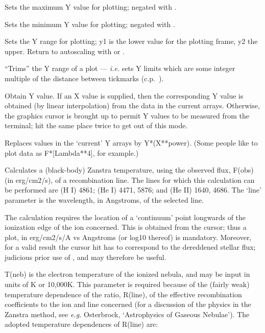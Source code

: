 \begin {description}
Sets the maximum Y value for plotting; negated with . 

Sets the minimum Y value for plotting; negated with . 

Sets the Y range for plotting; y1 is the lower value for the plotting
frame, y2 the upper. Return to autoscaling with   or . 

``Trims'' the Y range of a plot --- {\em i.e.} sets Y limits which are
some integer multiple of the distance between tickmarks (c.p.\ ). 

Obtain Y value. If an X value is supplied, then the corresponding Y
value is obtained (by linear interpolation) from the data in the
current arrays. Otherwise, the graphics cursor is brought up to permit
Y values to be measured from the terminal; hit the same place twice to
get out of this mode.

Replaces values in the `current' Y arrays by Y*(X**power). (Some
people like to plot data as F*[Lambda**4], for example.)

Calculates a (black-body) Zanstra temperature, using the observed
flux, F(obs) \newline (in erg/cm2/s), of a recombination line. The
lines for which this calculation can be performed are (H I) 4861; (He
I) 4471, 5876; and (He II) 1640, 4686. The `line' parameter is the
wavelength, in Angstroms, of the selected line.

The calculation requires the location of a `continuum' point longwards
of the ionization edge of the ion concerned. This is obtained from the
cursor; thus a plot, in erg/cm2/s/A vs Angstroms (or log10 thereof) is
mandatory. Moreover, for a valid result the cursor hit has to
correspond to the dereddened stellar flux; judicious prior use of
,    and   may therefore be useful.

T(neb) is the electron temperature of the ionized nebula, and may be
input in units of K or 10,000K. This parameter is required because of
the (fairly weak) temperature dependence of the ratio, R(line), of the
effective recombination coefficients to the ion and line concerned
(for a discussion of the physics in the Zanstra method, see {\em e.g.}
Osterbrock, `Astrophysics of Gaseous Nebulae'). The adopted
temperature dependences of R(line) are:


\end{description}
